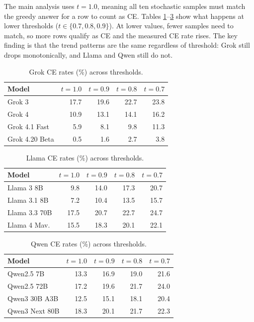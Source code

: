 \documentclass[12pt,twocolumn]{article}
\begin{document}
The main analysis uses $t{=}1.0$, meaning all ten stochastic samples
must match the greedy answer for a row to count as CE. Tables
\ref{tab:threshold_grok}--\ref{tab:threshold_qwen} show what happens
at lower thresholds ($t \in \{0.7, 0.8, 0.9\}$). At lower values,
fewer samples need to match, so more rows qualify as CE and the
measured CE rate rises. The key finding is that the trend patterns
are the same regardless of threshold: Grok still drops monotonically,
and Llama and Qwen still do not.

\begin{table}[H]
\centering
\footnotesize
\begin{tabular}{lrrrr}
\toprule
Model & $t{=}1.0$ & $t{=}0.9$ & $t{=}0.8$ & $t{=}0.7$ \\
\midrule
Grok 3         & 17.7 & 19.6 & 22.7 & 23.8 \\
Grok 4         & 10.9 & 13.1 & 14.1 & 16.2 \\
Grok 4.1 Fast  &  5.9 &  8.1 &  9.8 & 11.3 \\
Grok 4.20 Beta &  0.5 &  1.6 &  2.7 &  3.8 \\
\bottomrule
\end{tabular}
\caption{Grok CE rates (\%) across thresholds.}
\label{tab:threshold_grok}
\end{table}

\begin{table}[H]
\centering
\footnotesize
\begin{tabular}{lrrrr}
\toprule
Model & $t{=}1.0$ & $t{=}0.9$ & $t{=}0.8$ & $t{=}0.7$ \\
\midrule
Llama 3 8B     &  9.8 & 14.0 & 17.3 & 20.7 \\
Llama 3.1 8B   &  7.2 & 10.4 & 13.5 & 15.7 \\
Llama 3.3 70B  & 17.5 & 20.7 & 22.7 & 24.7 \\
Llama 4 Mav.   & 15.5 & 18.3 & 20.1 & 22.1 \\
\bottomrule
\end{tabular}
\caption{Llama CE rates (\%) across thresholds.}
\label{tab:threshold_llama}
\end{table}

\begin{table}[H]
\centering
\footnotesize
\begin{tabular}{lrrrr}
\toprule
Model & $t{=}1.0$ & $t{=}0.9$ & $t{=}0.8$ & $t{=}0.7$ \\
\midrule
Qwen2.5 7B     & 13.3 & 16.9 & 19.0 & 21.6 \\
Qwen2.5 72B    & 17.2 & 19.6 & 21.7 & 24.0 \\
Qwen3 30B A3B  & 12.5 & 15.1 & 18.1 & 20.4 \\
Qwen3 Next 80B & 18.3 & 20.1 & 21.7 & 22.3 \\
\bottomrule
\end{tabular}
\caption{Qwen CE rates (\%) across thresholds.}
\label{tab:threshold_qwen}
\end{table}
\end{document}
